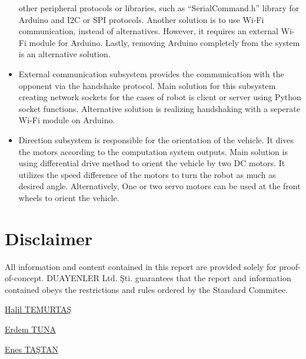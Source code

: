 \documentclass[a4paper,12pt]{article}
\begin{document}
\begin{itemize}
		other peripheral protocols or libraries, such as “SerialCommand.h” library for Arduino and I2C or SPI protocols. Another solution is to use Wi-Fi communication, instead of alternatives. However, it requires an external Wi-Fi module for Arduino. Lastly, removing Arduino completely from the system is an alternative solution.
		\item 	External communication subsystem provides the communication with the opponent via the handshake protocol. Main solution for this subsystem creating network sockets for the cases of robot is client or server using Python socket functions. Alternative solution is realizing handshaking with a seperate Wi-Fi module on Arduino.
		\item 	Direction subsystem is responsible for the orientation of the vehicle. It dives the motors according to the computation system outputs. Main solution is using differential drive method to orient the vehicle by two DC motors. It utilizes the speed difference of the motors to turn the robot as much as desired angle. Alternatively, One or two servo motors can be used at the front wheels to orient the vehicle.
	\end{itemize}
	
	\newpage
\begin{appendices}
	
		
		

	
\end{appendices}

	
	
	\newpage
	\section{Disclaimer}
	\vspace{1cm}
	
	\textsf{ All information and content contained in this report are provided solely for proof-of-concept. DUAYENLER Ltd. Şti. guarantees that the report and information contained obeys the restrictions and rules ordered by the Standard Commitee.}
	
	\vspace{1cm}
	

\begin{minipage}[b]{0.33\linewidth}
\centering
\underline{Halil TEMURTAŞ}
\end{minipage}%
\begin{minipage}[b]{0.33\linewidth}
\centering
\underline{Erdem TUNA}
\end{minipage}%
\begin{minipage}[b]{0.33\linewidth}
\centering
\underline{Enes TAŞTAN}
\end{minipage} \\[2.5cm]
\end{document}
